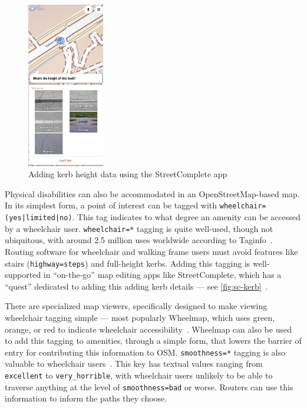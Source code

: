 \documentclass[hyphens]{final_report}
\begin{document}

\begin{figure}[ht]
    \centering
    \includegraphics[width=0.3\textwidth]{images/street-complete-kerb.jpg}
    \caption{Adding kerb height data using the StreetComplete app}\label{fig:sc-kerb}
\end{figure}

Physical disabilities can also be accommodated in an OpenStreetMap-based map. In its simplest form, a point of interest can be tagged with \texttt{wheelchair=(yes|limited|no)}. This tag indicates to what degree an amenity can be accessed by a wheelchair user. \texttt{wheelchair=*} tagging is quite well-used, though not ubiquitous, with around 2.5 million uses worldwide according to Taginfo~\cite{taginfo-wheelchair}. Routing software for wheelchair and walking frame users must avoid features like stairs (\texttt{highway=steps}) and full-height kerbs. Adding this tagging is well-supported in ``on-the-go'' map editing apps like StreetComplete, which has a ``quest'' dedicated to adding this adding kerb details --- see \autoref{fig:sc-kerb}~\cite{streetcomplete}. 

There are specialized map viewers, specifically designed to make viewing wheelchair tagging simple --- most popularly Wheelmap, which uses green, orange, or red to indicate wheelchair accessibility~\cite{wheelmap}. Wheelmap can also be used to add this tagging to amenities, through a simple form, that lowers the barrier of entry for contributing this information to OSM\@. \texttt{smoothness=*} tagging is also valuable to wheelchair users~\cite{osm-wiki-smoothness}. This key has textual values ranging from \texttt{excellent} to \texttt{very\_horrible}, with wheelchair users unlikely to be able to traverse anything at the level of \texttt{smoothness=bad} or worse. Routers can use this information to inform the paths they choose.
\end{document}

